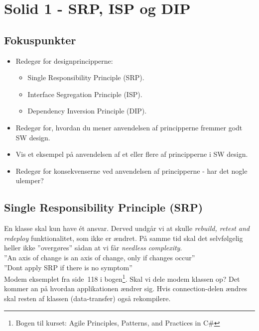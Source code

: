 \section{Solid 1 - SRP, ISP og DIP}

\subsection{Fokuspunkter}

\begin{itemize}
	\item Redegør for designprincipperne:
	\begin{itemize}
		\item Single Responsibility Principle (SRP).
		\item Interface Segregation Principle (ISP).
		\item Dependency Inversion Principle (DIP).
	\end{itemize}
	\item Redegør for, hvordan du mener anvendelsen af principperne fremmer godt SW design.
	\item Vis et eksempel på anvendelsen af et eller flere af principperne i SW design.
	\item Redegør for konsekvenserne ved anvendelsen af principperne - har det nogle ulemper?
\end{itemize}


\subsection{Single Responsibility Principle (SRP)}
En klasse skal kun have ét ansvar. Derved undgår vi at skulle \textit{rebuild, retest and redeploy} funktionalitet, som ikke er ændret. På samme tid skal det selvfølgelig heller ikke ''overgøres'' sådan at vi får \textit{needless complexity}.\\

''An axis of change is an axis of change, only if changes occur''\\

''Dont apply SRP if there is no symptom''\\

Modem eksemplet fra side~118 i bogen\footnote{Bogen til kurset: Agile Principles, Patterns, and Practices in C\#}. Skal vi dele modem klassen op? Det kommer an på hvordan applikationen ændrer sig. Hvis connection-delen ændres skal resten af klassen (data-transfer) også rekompilere.

